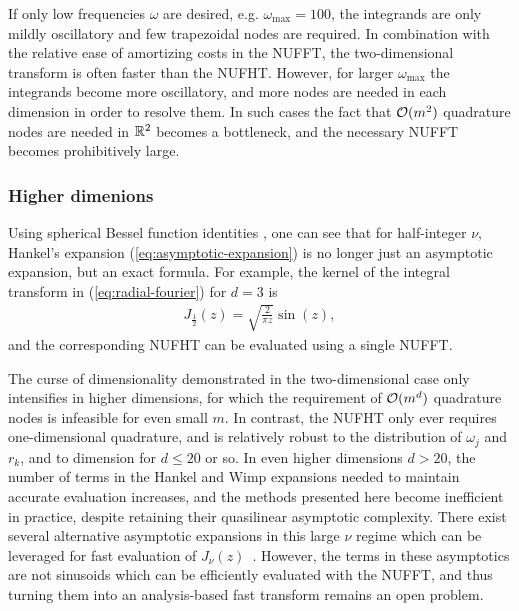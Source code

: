 If only low frequencies $\omega$ are desired, e.g. $\omega_{\text{max}} = 100$,
the integrands are only mildly oscillatory and few trapezoidal nodes are
required. In combination with the relative ease of amortizing costs in the
NUFFT, the two-dimensional transform is often faster than the NUFHT. However,
for larger $\omega_{\text{max}}$ the integrands become more oscillatory, and
more nodes are needed in each dimension in order to resolve them. In such cases
the fact that $\mathcal{O}(m^2)$ quadrature nodes are needed in $\mathbb{R}^2$ becomes a
bottleneck, and the necessary NUFFT becomes prohibitively large. 


\subsubsection{Higher dimenions}

Using spherical Bessel function identities \cite[10.47.3,
10.49.2]{olver2010nist}, one can see that for half-integer $\nu$, Hankel's
expansion (\ref{eq:asymptotic-expansion}) is no longer just an asymptotic
expansion, but an exact formula.
For example, the kernel of the integral transform in (\ref{eq:radial-fourier})
for $d = 3$ is
\begin{align}
  J_{\frac{1}{2}}(z) = \sqrt{\frac{2}{\pi z}} \sin(z),
\end{align}
and the corresponding NUFHT can be evaluated using a single NUFFT.

The curse of dimensionality demonstrated in the two-dimensional case only
intensifies in higher dimensions, for which the requirement of $\mathcal{O}(m^d)$
quadrature nodes is infeasible for even small $m$. In contrast, the NUFHT only
ever requires one-dimensional quadrature, and is relatively robust to the
distribution of $\omega_j$ and $r_k$, and to dimension for $d \leq 20$ or so. In
even higher dimensions $d > 20$, the number of terms in the Hankel and Wimp
expansions needed to maintain accurate evaluation increases, and the methods
presented here become inefficient in practice, despite retaining their
quasilinear asymptotic complexity. There exist several alternative asymptotic
expansions in this large $\nu$ regime which can be leveraged for fast evaluation
of $J_\nu(z)$~\cite{heitman2015asymptotics, olver2010nist}.
However, the terms in these asymptotics are not sinusoids which can be
efficiently evaluated with the NUFFT, and thus turning them into an
analysis-based fast transform remains an open problem.

